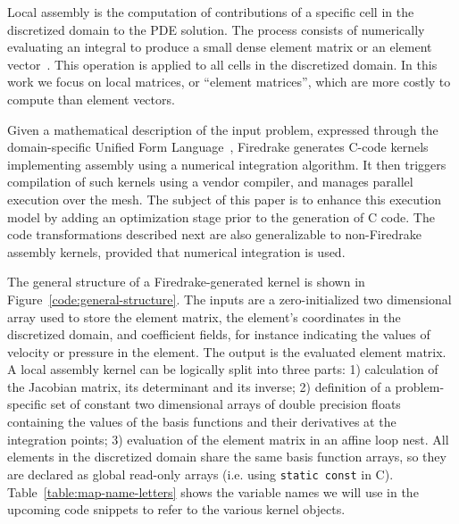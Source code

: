 \documentclass[conference]{IEEEtran}
\begin{document}
Local assembly is the computation of contributions of a specific cell in the discretized domain to the PDE solution. The process consists of numerically evaluating an integral to produce a small dense element matrix or an element vector~\cite{quadrature1, fluidity_manual_v4}. This operation is applied to all cells in the discretized domain. In this work we focus on local matrices, or ``element matrices'', which are more costly to compute than element vectors.

Given a mathematical description of the input problem, expressed through the domain-specific Unified Form Language~\cite{ufl}, Firedrake generates C-code kernels implementing assembly using a numerical integration algorithm. It then triggers compilation of such kernels using a vendor compiler, and manages parallel execution over the mesh. The subject of this paper is to enhance this execution model by adding an optimization stage prior to the generation of C code. The code transformations described next are also generalizable to non-Firedrake assembly kernels, provided that numerical integration is used.

The general structure of a Firedrake-generated kernel is shown in Figure~\ref{code:general-structure}. The inputs are a zero-initialized two dimensional array used to store the element matrix, the element's coordinates in the discretized domain, and coefficient fields, for instance indicating the values of velocity or pressure in the element. The output is the evaluated element matrix. A local assembly kernel can be logically split into three parts: 1) calculation of the Jacobian matrix, its determinant and its inverse; 2) definition of a problem-specific set of constant two dimensional arrays of double precision floats containing the values of the basis functions and their derivatives at the integration points; 3) evaluation of the element matrix in an affine loop nest. All elements in the discretized domain share the same basis function arrays, so they are declared as global read-only arrays (i.e. using \texttt{static const} in C). Table~\ref{table:map-name-letters} shows the variable names we will use in the upcoming code snippets to refer to the various kernel objects.
\end{document}
